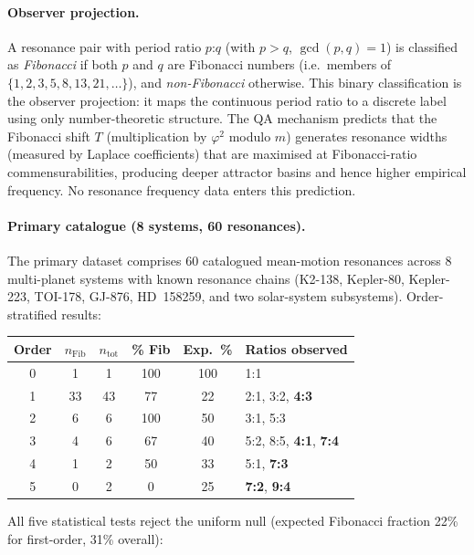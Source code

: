 \documentclass[11pt]{article}
\begin{document}
\paragraph{Observer projection.}
A resonance pair with period ratio $p$:$q$ (with $p > q$, $\gcd(p,q)=1$)
is classified as \emph{Fibonacci} if both $p$ and $q$ are Fibonacci numbers
(i.e.\ members of $\{1,2,3,5,8,13,21,\ldots\}$), and \emph{non-Fibonacci} otherwise.
This binary classification is the observer projection: it maps the continuous
period ratio to a discrete label using only number-theoretic structure.
The QA mechanism predicts that the Fibonacci shift $T$ (multiplication by
$\varphi^2$ modulo $m$) generates resonance widths
(measured by Laplace coefficients) that are maximised at Fibonacci-ratio
commensurabilities, producing deeper attractor basins and hence higher
empirical frequency.  No resonance frequency data enters this prediction.

\paragraph{Primary catalogue (8 systems, 60 resonances).}
The primary dataset comprises 60 catalogued mean-motion resonances across
8 multi-planet systems with known resonance chains (K2-138, Kepler-80,
Kepler-223, TOI-178, GJ-876, HD~158259, and two solar-system subsystems).
Order-stratified results:

\begin{center}
\small
\begin{tabular}{cccccl}
\toprule
\textbf{Order} & $n_\text{Fib}$ & $n_\text{tot}$ & \% Fib & Exp.\ \% & \textbf{Ratios observed} \\
\midrule
0 & 1 & 1  & 100 & 100 & 1:1 \\
1 & 33 & 43 & 77  & 22  & 2:1, 3:2, \textbf{4:3} \\
2 & 6  & 6  & 100 & 50  & 3:1, 5:3 \\
3 & 4  & 6  & 67  & 40  & 5:2, 8:5, \textbf{4:1}, \textbf{7:4} \\
4 & 1  & 2  & 50  & 33  & 5:1, \textbf{7:3} \\
5 & 0  & 2  & 0   & 25  & \textbf{7:2}, \textbf{9:4} \\
\bottomrule
\end{tabular}
\end{center}

All five statistical tests reject the uniform null (expected Fibonacci fraction
22\% for first-order, 31\% overall):
\end{document}
